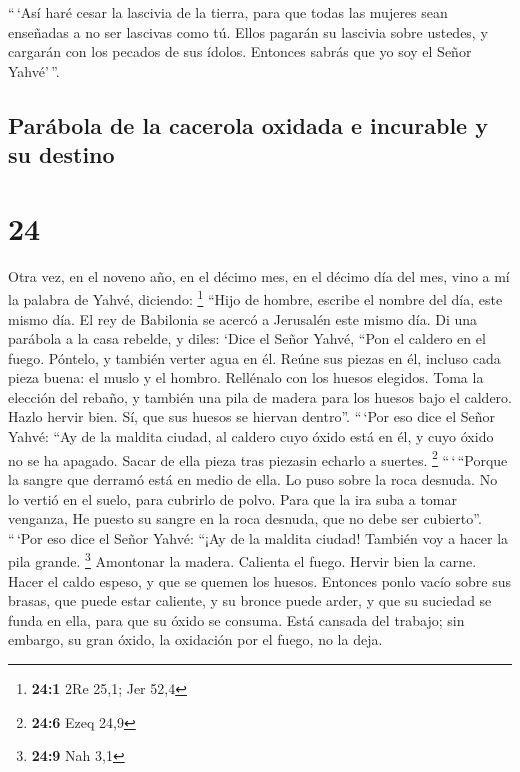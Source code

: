  ``\,`Así haré cesar la lascivia de la tierra, para que
todas las mujeres sean enseñadas a no ser lascivas como tú.
 Ellos pagarán su lascivia sobre ustedes, y cargarán con
los pecados de sus ídolos. Entonces sabrás que yo soy el Señor
Yahvé'\,''.

\hypertarget{paruxe1bola-de-la-cacerola-oxidada-e-incurable-y-su-destino}{%
\subsection{Parábola de la cacerola oxidada e incurable y su
destino}\label{paruxe1bola-de-la-cacerola-oxidada-e-incurable-y-su-destino}}

\hypertarget{section-23}{%
\section{24}\label{section-23}}

 Otra vez, en el noveno año, en el décimo mes, en el
décimo día del mes, vino a mí la palabra de Yahvé, diciendo: \footnote{\textbf{24:1}
  2Re 25,1; Jer 52,4}  ``Hijo de hombre, escribe el nombre
del día, este mismo día. El rey de Babilonia se acercó a Jerusalén este
mismo día.  Di una parábola a la casa rebelde, y diles:
`Dice el Señor Yahvé, ``Pon el caldero en el fuego. Póntelo, y también
verter agua en él.  Reúne sus piezas en él, incluso cada
pieza buena: el muslo y el hombro. Rellénalo con los huesos elegidos.
 Toma la elección del rebaño, y también una pila de madera
para los huesos bajo el caldero. Hazlo hervir bien. Sí, que sus huesos
se hiervan dentro''.  ``\,`Por eso dice el Señor Yahvé:
``Ay de la maldita ciudad, al caldero cuyo óxido está en él, y cuyo
óxido no se ha apagado. Sacar de ella pieza tras piezasin echarlo a
suertes. \footnote{\textbf{24:6} Ezeq 24,9} 
``\,`\,``Porque la sangre que derramó está en medio de ella. Lo puso
sobre la roca desnuda. No lo vertió en el suelo, para cubrirlo de polvo.
 Para que la ira suba a tomar venganza, He puesto su
sangre en la roca desnuda, que no debe ser cubierto''. 
``\,`Por eso dice el Señor Yahvé: ``¡Ay de la maldita ciudad! También
voy a hacer la pila grande. \footnote{\textbf{24:9} Nah 3,1}
 Amontonar la madera. Calienta el fuego. Hervir bien la
carne. Hacer el caldo espeso, y que se quemen los huesos.
 Entonces ponlo vacío sobre sus brasas, que puede estar
caliente, y su bronce puede arder, y que su suciedad se funda en ella,
para que su óxido se consuma.  Está cansada del trabajo;
sin embargo, su gran óxido, la oxidación por el fuego, no la deja.


